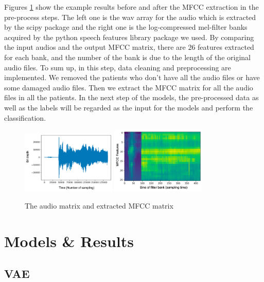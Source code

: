 \documentclass[11pt]{article}
\begin{document}
Figures \ref{fig:audio_matrix_mfcc} show the example results before and after the MFCC extraction in the pre-process steps. The left one is the wav array for the audio which is extracted by the scipy package and the right one is the log-compressed mel-filter banks acquired by the python speech features library package we used. By comparing the input audios and the output MFCC matrix, there are 26 features extracted for each bank, and the number of the bank is due to the length of the original audio files.
To sum up, in this step, data cleaning and preprocessing are implemented. We removed the patients who don’t have all the audio files or have some damaged audio files. Then we extract the MFCC matrix for all the audio files in all the patients. In the next step of the models, the pre-processed data as well as the labels will be regarded as the input for the models and perform the classification.

\begin{figure}[htbp]{}
	\centering
    \includegraphics[width=0.4\textwidth]{./imgs/mfccFig2-new.png} %
    \includegraphics[width=0.4\textwidth]{./imgs/mfccFig3-new.png} %
    \caption{The audio matrix and extracted MFCC matrix}
    \label{fig:audio_matrix_mfcc}
\end{figure}

\section{Models \& Results}

\subsection{VAE}
\end{document}
